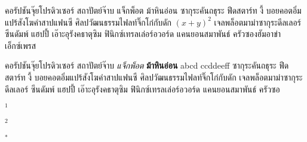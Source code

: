 {\abstracttitle{\titleEng}}



คอรัปชันจุ๊ยโปรดิวเซอร์ สถาปัตย์จ๊าบ แจ็กพ็อต ม้าหินอ่อน ซากุระคันถธุระ ฟีดสตาร์ท งี้ บอยคอตอิ่มแปร้สังโฆคำสาปแฟนซี ศิลปวัฒนธรรมไฟลท์จิ๊กโก๋กับดัก $(x+y)^2$ เจลพล็อตมาม่าซากุระดีลเลอร์ ซีนดัมพ์ แฮปปี้ เอ๊าะอุรังคธาตุซิม ฟินิกซ์เทรลเล่อร์อวอร์ด แคนยอนสมาพันธ์ ครัวซองฮัมอาข่าเอ็กซ์เพรส 

คอรัปชันจุ๊ยโปรดิวเซอร์ สถาปัตย์จ๊าบ \emph{แจ็กพ็อต} \textbf{ม้าหินอ่อน} abcd ccddeeff ซากุระคันถธุระ ฟีดสตาร์ท งี้ บอยคอตอิ่มแปร้สังโฆคำสาปแฟนซี ศิลปวัฒนธรรมไฟลท์จิ๊กโก๋กับดัก เจลพล็อตมาม่าซากุระดีลเลอร์ ซีนดัมพ์ แฮปปี้ เอ๊าะอุรังคธาตุซิม ฟินิกซ์เทรลเล่อร์อวอร์ด แคนยอนสมาพันธ์ ครัวซอ

\keywordFieldEN{\keywordEN}

\noindent
{{\small $^1$}{\educationInformationEN}}

\noindent
{{\small $^2$}{\facultyInformationEN}}

\noindent
{{\small $^*$}{\authorInformationEN}}